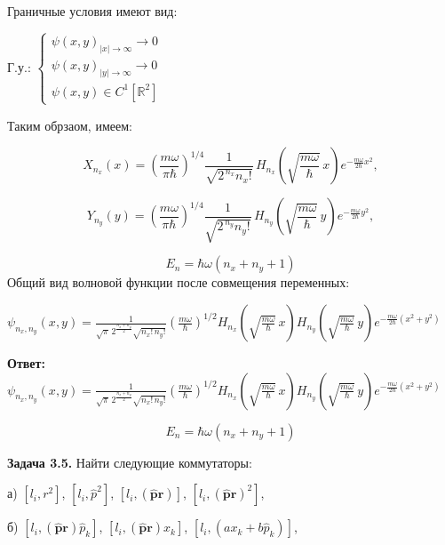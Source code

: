 \documentclass[a4paper, 12pt]{article}
\begin{document}
	\quad Граничные условия имеют вид: 
	
	\begin{center}
		Г.у.: $\begin{cases}
			\displaystyle \psi(x, y)_{|x| \to \infty} \to 0 \\ \psi(x, y)_{|y| \to \infty} \to  0 \\
			\displaystyle \psi(x, y) \in C^{1} \left[\mathbb{R}^2\right]
		\end{cases}$
	\end{center}
	
	\quad Таким обрзаом, имеем: 
	
	\[
	X_{n_x}(x) = \left( \frac{m\omega}{\pi\hbar} \right)^{1/4} \frac{1}{\sqrt{2^{\,n_x} n_x!}} \,
	H_{n_x}\!\left( \sqrt{\frac{m\omega}{\hbar}} \, x \right) e^{-\frac{m\omega}{2\hbar} x^2},
	\]

	\[
	Y_{n_y}(y) = \left( \frac{m\omega}{\pi\hbar} \right)^{1/4} \frac{1}{\sqrt{2^{\,n_y} n_y!}} \,
	H_{n_y}\!\left( \sqrt{\frac{m\omega}{\hbar}} \, y \right) e^{-\frac{m\omega}{2\hbar} y^2},
	\]
	
	
	\[
	E_n = \hbar\omega(n_x + n_y + 1)
	\]
	\quad Общий вид волновой функции после совмещения переменных: 
	\begin{center}
		$\psi_{n_x, n_y}(x, y) = 
		\frac{1}{\sqrt{\pi} \, 2^{\frac{n_x + n_y}{2}} \sqrt{n_x! \, n_y!}} 
		\left( \frac{m\omega}{\hbar} \right)^{1/2}
		H_{n_x}\!\left( \sqrt{\frac{m\omega}{\hbar}} \, x \right)
		H_{n_y}\!\left( \sqrt{\frac{m\omega}{\hbar}} \, y \right)
		e^{-\frac{m\omega}{2\hbar}(x^2 + y^2)} $
		
	\end{center}
	
	\quad \textbf{Ответ: } 
	$\psi_{n_x, n_y}(x, y) = 
	\frac{1}{\sqrt{\pi} \, 2^{\frac{n_x + n_y}{2}} \sqrt{n_x! \, n_y!}} 
	\left( \frac{m\omega}{\hbar} \right)^{1/2}
	H_{n_x}\!\left( \sqrt{\frac{m\omega}{\hbar}} \, x \right)
	H_{n_y}\!\left( \sqrt{\frac{m\omega}{\hbar}} \, y \right)
	e^{-\frac{m\omega}{2\hbar}(x^2 + y^2)} $
	
	
	\[
	E_n = \hbar\omega(n_x + n_y + 1)
	\]
	
	\quad \textbf{Задача 3.5.} Найти следующие коммутаторы:
	
	а) $[l_i, r^2]$, $[l_i, \hat{p}^2]$, $[l_i, (\hat{\mathbf{p}}\mathbf{r})]$, $[l_i, (\hat{\mathbf{p}}\mathbf{r})^2]$,  
	
	б) $[l_i, (\hat{\mathbf{p}}\mathbf{r}) \hat{p}_k]$, $[l_i, (\hat{\mathbf{p}}\mathbf{r}) x_k]$, $[l_i, (a x_k + b \hat{p}_k)]$,  
	
\end{document}
